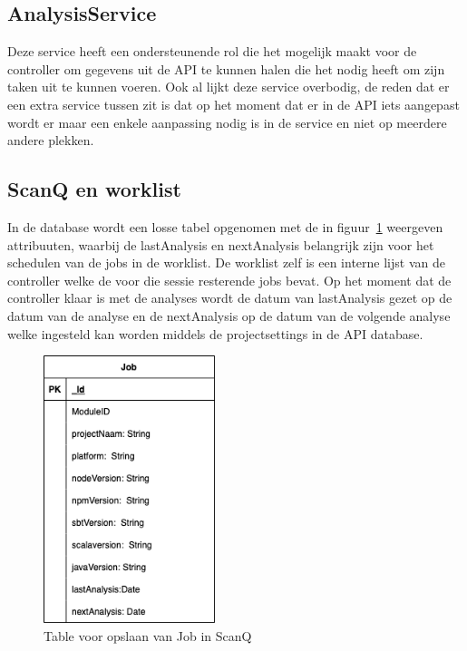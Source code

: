 \subsection{AnalysisService}\label{subsec:analysisservice}
Deze service heeft een ondersteunende rol die het mogelijk maakt voor de controller om gegevens uit de API te kunnen halen die het nodig heeft om  zijn taken uit te kunnen voeren. Ook al lijkt deze service overbodig, de reden dat er een extra service tussen zit is dat op het moment dat er in de API iets aangepast wordt er maar een enkele aanpassing nodig is in de service en niet op meerdere andere plekken.

\subsection{ScanQ en worklist}\label{subsec:scanq}
In de database wordt een losse tabel opgenomen met de in figuur~\ref{fig:scanQERD} weergeven attribuuten, waarbij de lastAnalysis en nextAnalysis belangrijk zijn voor het schedulen van de jobs in de worklist.
De worklist zelf is een interne lijst van de controller welke de voor die sessie resterende jobs bevat. Op het moment dat de controller klaar is met de analyses wordt de datum van lastAnalysis gezet op de datum van de analyse en de nextAnalysis op de datum van de volgende analyse welke ingesteld kan worden middels de projectsettings in de API database.
\begin{figure}[bth]
    \myfloatalign
    \includegraphics[width=5cm]{gfx/SOUPAPI-scanQERD}
    \caption{Table voor opslaan van Job in ScanQ}
    \label{fig:scanQERD}
\end{figure}
